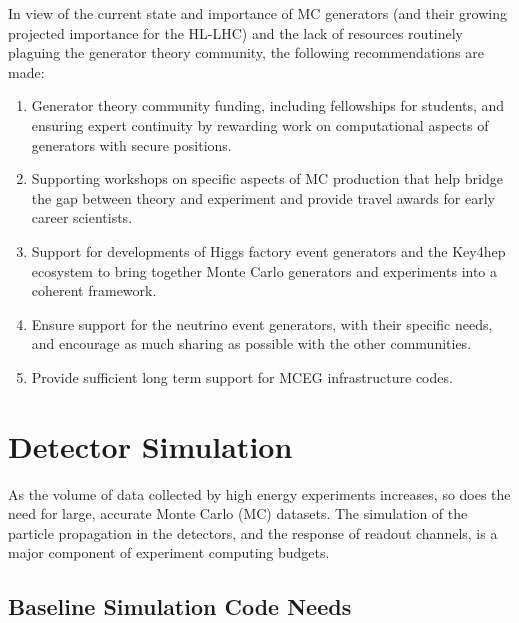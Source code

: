 \documentclass[10pt,a4paper]{article}
\begin{document}
In view of the current state and importance of MC generators (and their
growing projected importance for the HL-LHC) and the lack of resources
routinely plaguing the generator theory community, the following
recommendations are made:

\begin{enumerate}
\def\labelenumi{\arabic{enumi}.}
\item
  Generator theory community funding, including fellowships for students, and
  ensuring expert continuity by rewarding work on computational aspects of
  generators with secure positions.
\item
  Supporting workshops on specific aspects of MC production that help bridge the
  gap between theory and experiment and provide travel awards for early career
  scientists.
\item
  Support for developments of Higgs factory event generators and the
  Key4hep ecosystem to bring together Monte Carlo generators and
  experiments into a coherent framework.
\item
  Ensure support for the neutrino event generators, with their specific
  needs, and encourage as much sharing as possible with the other
  communities.
\item 
  Provide sufficient long term support for MCEG infrastructure codes.
\end{enumerate}

\section{Detector Simulation}\label{detector-simulation}

As the volume of data collected by high energy experiments increases, so
does the need for large, accurate Monte Carlo (MC) datasets. The simulation
of the particle propagation in the detectors, and the response of readout
channels, is a major component of experiment computing budgets.

\subsection{Baseline Simulation Code
Needs}\label{baseline-simulation-code-needs}
\end{document}
